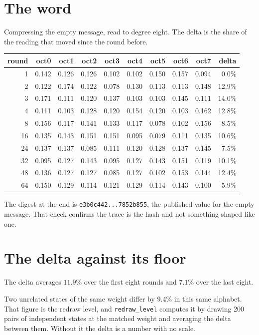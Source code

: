 \section{The word}

Compressing the empty message, read to degree eight. The delta is the share of the reading that moved since the round before.

\begin{center}
\begin{tabular}{@{}rrrrrrrrrr@{}}
\toprule
round & oct0 & oct1 & oct2 & oct3 & oct4 & oct5 & oct6 & oct7 & delta \\
\midrule
1 & 0.142 & 0.126 & 0.126 & 0.102 & 0.102 & 0.150 & 0.157 & 0.094 & 0.0\% \\
2 & 0.122 & 0.174 & 0.122 & 0.078 & 0.130 & 0.113 & 0.113 & 0.148 & 12.9\% \\
3 & 0.171 & 0.111 & 0.120 & 0.137 & 0.103 & 0.103 & 0.145 & 0.111 & 14.0\% \\
4 & 0.111 & 0.103 & 0.128 & 0.120 & 0.154 & 0.120 & 0.103 & 0.162 & 12.8\% \\
8 & 0.156 & 0.117 & 0.141 & 0.133 & 0.117 & 0.078 & 0.102 & 0.156 & 8.5\% \\
16 & 0.135 & 0.143 & 0.151 & 0.151 & 0.095 & 0.079 & 0.111 & 0.135 & 10.6\% \\
24 & 0.137 & 0.137 & 0.085 & 0.111 & 0.120 & 0.128 & 0.137 & 0.145 & 7.5\% \\
32 & 0.095 & 0.127 & 0.143 & 0.095 & 0.127 & 0.143 & 0.151 & 0.119 & 10.1\% \\
48 & 0.136 & 0.127 & 0.127 & 0.085 & 0.127 & 0.102 & 0.153 & 0.144 & 12.4\% \\
64 & 0.150 & 0.129 & 0.114 & 0.121 & 0.129 & 0.114 & 0.143 & 0.100 & 5.9\% \\
\bottomrule
\end{tabular}
\end{center}

The digest at the end is \texttt{e3b0c442...7852b855}, the published value for the empty message. That check confirms the trace is the hash and not something shaped like one.

\section{The delta against its floor}

The delta averages \(11.9\%\) over the first eight rounds and \(7.1\%\) over the last eight.

Two unrelated states of the same weight differ by \(9.4\%\) in this same alphabet. That figure is the redraw level, and \texttt{redraw\_level} computes it by drawing \(200\) pairs of independent states at the matched weight and averaging the delta between them. Without it the delta is a number with no scale.

